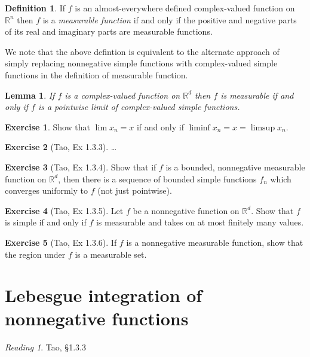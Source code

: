 \documentclass[11pt,oneside]{amsbook}
\newcommand{\RR}{{\mathbb R}}
\theoremstyle{definition}
\newtheorem{exerc}{Exercise}[section]
\theoremstyle{plain}
\newtheorem{lem}[thm]{Lemma}
\theoremstyle{definition}
\newtheorem{defn}[thm]{Definition}
\theoremstyle{remark}
\newtheorem*{reading}{Reading}
\numberwithin{equation}{section}
\numberwithin{figure}{section}
\begin{document}
\begin{defn}
  If $f$ is an almost-everywhere defined complex-valued function on $\RR^n$ then $f$ is a \emph{measurable function} if and only if the positive and negative parts of its real and imaginary parts are measurable functions.
\end{defn}

We note that the above defintion is equivalent to the alternate approach of simply replacing nonnegative simple functions with complex-valued simple functions in the definition of measurable function.

\begin{lem}
  If $f$ is a complex-valued function on $\RR^d$ then $f$ is measurable if and only if $f$ is a pointwise limit of complex-valued simple functions.
\end{lem}

\begin{exerc}
  Show that $\lim x_n=x$ if and only if $\liminf x_n=x=\limsup x_n$.
\end{exerc}

\begin{exerc}[Tao, Ex 1.3.3]
  \ldots
\end{exerc}

\begin{exerc}[Tao, Ex 1.3.4]
  Show that if $f$ is a bounded, nonnegative measurable function on $\RR^d$, then there is a sequence of bounded simple functions $f_n$ which converges uniformly to $f$ (not just pointwise).
\end{exerc}

\begin{exerc}[Tao, Ex 1.3.5]
  Let $f$ be a nonnegative function on $\RR^d$. Show that $f$ is simple if and only if $f$ is measurable and takes on at most finitely many values.
\end{exerc}

\begin{exerc}[Tao, Ex 1.3.6]
  If $f$ is a nonnegative measurable function, show that the region under $f$ is a measurable set.
\end{exerc}

\newpage
\section{Lebesgue integration of nonnegative functions}

\begin{reading}
  Tao, \S 1.3.3
\end{reading}
\end{document}
